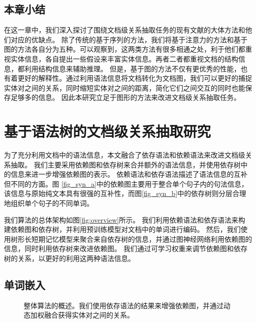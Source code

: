 \documentclass[bachelor]{thesis-uestc}
\begin{document}
\section{本章小结}

在这一章中，我们深入探讨了围绕文档级关系抽取任务的现有文献的大体方法和他们对应的优缺点。
除了传统的基于序列的方法，我们将基于注意力的方法和基于图的方法各自分为五种。可以观察到，这两类方法有很多相通之处，利于他们都重视实体信息，各自提出一些假设来丰富实体信息。再者二者都重视文档的结构信息，都利用结构信息来辅助推理。
但是，基于图的方法不仅有更优秀的性能，也有着更好的解释性。通过利用语法信息将文档转化为文档图，我们可以更好的捕捉实体对之间的关系，同时缩短实体对之间的距离，简化它们之间交互的同时也能保存足够多的信息。
因此本研究立足于图形的方法来改进文档级关系抽取任务。


\chapter{基于语法树的文档级关系抽取研究}
为了充分利用文档中的语法信息，本文融合了依存语法和依赖语法来改进文档级关系抽取。
我们主要采用依赖图和依存树来合并额外的语法信息，并使用依存树中的信息来进一步增强依赖图的表示。
依赖语法和依存语法描述了语法信息的互补但不同的方面。图 \ref{fig_syn_a}中的依赖图主要用于整合单个句子内的句法信息，该信息与原始纯文本具有很强的互补性，而图\ref{fig_syn_b}中的依存树则分层合理地组织单个句子的不同单词。\par



我们算法的总体架构如图\ref{fig:overview}所示。
我们利用依赖语法和依存语法来构建依赖图和依存树，并利用预训练模型对文档中的单词进行编码。
然后，我们使用树形长短期记忆模型来聚合来自依存树的信息，并通过图神经网络利用依赖图的信息，同时利用依存树来改进依赖图。
我们通过可学习权重来调节依赖图和依存树的关系，以更好的利用这两种语法信息。

\section{单词嵌入}
\begin{figure}[t]
    \caption{整体算法的概述。我们使用依存语法的结果来增强依赖图，并通过动态加权融合获得实体对之间的关系。}
\end{figure}\label{fig:overview}
\end{document}

